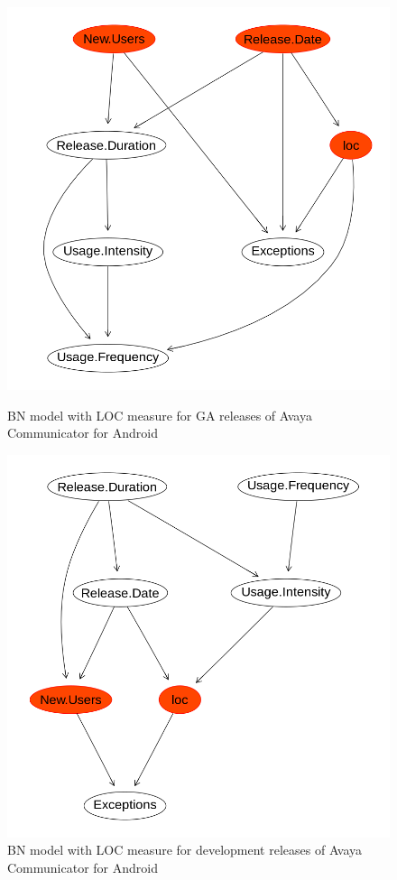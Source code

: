 \documentclass[smallcondensed]{svjour3}     %
\begin{document}
\begin{figure}[!t]
\centering
\begin{minipage}{.45\textwidth}
\includegraphics[width=\linewidth]{loc_ga_bn}%
\caption{BN model with LOC measure for GA releases of Avaya Communicator for Android}
\label{fig:lbng}
\end{minipage}
\hfill
\begin{minipage}{.45\textwidth}
\includegraphics[width=\linewidth]{loc_d_bn}%
\caption{BN model with LOC measure for development releases of Avaya Communicator for Android }
\label{fig:lbnd}
\end{minipage}
\end{figure}
\end{document}

